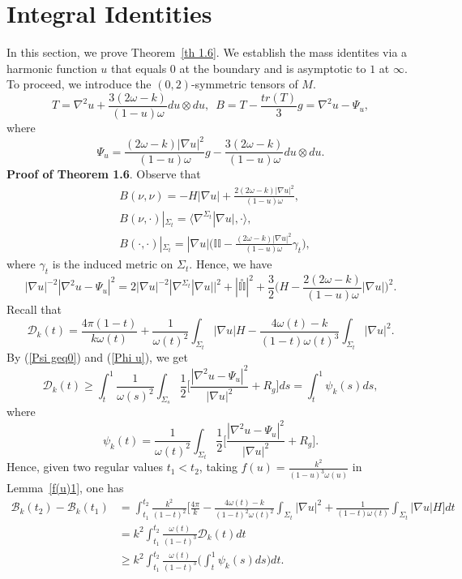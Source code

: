 \documentclass[12pt]{article}
\theoremstyle{definition}
\theoremstyle{plain}
\numberwithin{equation}{section}
\begin{document}
\section{\bf Integral Identities }
In this section, we prove Theorem~\ref{th 1.6}. We establish the mass identites via a harmonic
function $ u $ that equals $ 0 $ at the boundary and is asymptotic to $ 1 $ at $ \infty $. To proceed, we introduce the $ (0,2) $-symmetric tensors of $ M $.
$$
T=\nabla^{2}u+\frac{3(2\omega-k)}{(1-u)\omega}du\otimes du,\,\,\,B=T-\frac{tr(T)}{3}g=\nabla^{2}u-\Psi_{u},
$$
where
$$
\Psi_{u}=\frac{(2\omega-k)|\nabla u|^{2}}{(1-u)\omega}g-\frac{3(2\omega-k)}{(1-u)\omega}du\otimes du.
$$
\textbf{Proof of Theorem 1.6}.
Observe that 
$$
\begin{aligned}
&B(\nu,\nu)=-H|\nabla u|+\frac{2(2\omega-k)|\nabla u|^{2}}{(1-u)\omega},\\
&B(\nu,\cdot)|_{\Sigma_{t}}=\langle \nabla^{\Sigma_{t}}|\nabla u|, \cdot \rangle,\\
&B(\cdot,\cdot)|_{\Sigma_{t}}=|\nabla u|\Big(\mathbb{II}-\frac{(2\omega-k)|\nabla u|^{2}}{(1-u)\omega}\gamma_{t} \Big),
\end{aligned}
$$
where $ \gamma_{t} $ is the induced metric on $ \Sigma_{t} $. Hence, we have
\begin{equation}\label{Phi u}
|\nabla u|^{-2}|\nabla^{2}u-\Psi_{u}|^{2}=2|\nabla u|^{-2}|\nabla^{\Sigma_{t}}|\nabla u| |^{2}+|\overset{\circ}{\mathbb{II}}|^{2}+\frac{3}{2}\Big(H-\frac{2(2\omega-k)}{(1-u)\omega}|\nabla u|\Big)^{2}.
\end{equation}
Recall that 
$$
\mathcal{D}_{k}(t)=\frac{4\pi(1-t)}{k\omega(t)}+\frac{1}{\omega(t)^{2}}\int_{\Sigma_{t}}|\nabla u|H-\frac{4\omega(t)-k}{(1-t)\omega(t)^{3}}\int_{\Sigma_{t}}|\nabla u|^{2}.
$$
By (\ref{Psi geq0}) and (\ref{Phi u}), we get
$$
\mathcal{D}_{k}(t)\geq \int_{t}^{1}\frac{1}{\omega(s)^{2}}\int_{\Sigma_{s}}\frac{1}{2}\Big[\frac{|\nabla^{2}u-\Psi_{u}|^{2}}{|\nabla u|^{2}}+R_{g} \Big]ds=\int_{t}^{1}\psi_{k}(s)ds,
$$
where 
$$
\psi_{k}(t)=\frac{1}{\omega(t)^{2}}\int_{\Sigma_{t}}\frac{1}{2}\Big[\frac{|\nabla^{2}u-\Psi_{u}|^{2}}{|\nabla u|^{2}}+R_{g} \Big].
$$
Hence, given two regular values $ t_{1}<t_{2} $, taking $ f(u)=\frac{k^{2}}{(1-u)^{3}\omega(u)} $ in Lemma~\ref{f(u)1}, one has 
\begin{equation}\label{mono B}
\begin{aligned}
\mathcal{B}_{k}(t_{2})-\mathcal{B}_{k}(t_{1})&=\int_{t_{1}}^{t_{2}}\frac{k^{2}}{(1-t)^{2}}\Big[\frac{4\pi}{k}-\frac{4\omega(t)-k}{(1-t)^{2}\omega(t)^{2}}\int_{\Sigma_{t}}|\nabla u|^{2}+\frac{1}{(1-t)\omega(t)}\int_{\Sigma_{t}}|\nabla u|H \Big]dt\\
&=k^{2}\int_{t_{1}}^{t_{2}}\frac{\omega(t)}{(1-t)^{3}}\mathcal{D}_{k}(t)dt\\
&\geq k^{2}\int_{t_{1}}^{t_{2}}\frac{\omega(t)}{(1-t)^{3}}\Big(\int_{t}^{1}\psi_{k}(s)ds\Big)dt.
\end{aligned}
\end{equation}
\end{document}
